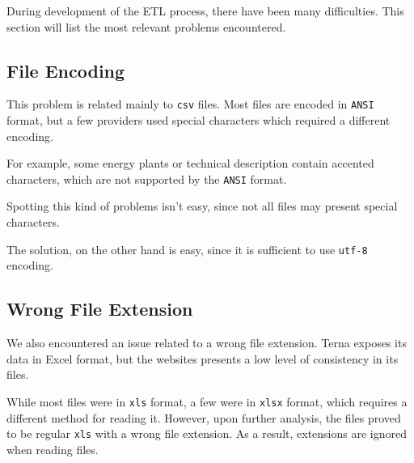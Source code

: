 During development of the ETL process, there have been many difficulties.
This section will list the most relevant problems encountered.

\subsection{File Encoding}
    This problem is related mainly to \texttt{csv} files.
    Most files are encoded in \texttt{ANSI} format, but a few providers used special characters which required a different encoding.
    
    For example, some energy plants or technical description contain accented characters, which are not supported by the \texttt{ANSI} format.
    
    Spotting this kind of problems isn't easy, since not all files may present special characters.
    
    The solution, on the other hand is easy, since it is sufficient to use \texttt{utf-8} encoding.

\subsection{Wrong File Extension}
    We also encountered an issue related to a wrong file extension.
    Terna exposes its data in Excel format, but the websites presents a low level of consistency in its files.
    
    While most files were in \texttt{xls} format, a few were in \texttt{xlsx} format, which requires a different method for reading it.
    However, upon further analysis, the files proved to be regular \texttt{xls} with a wrong file extension.
    As a result, extensions are ignored when reading files.
    
    
    
    
